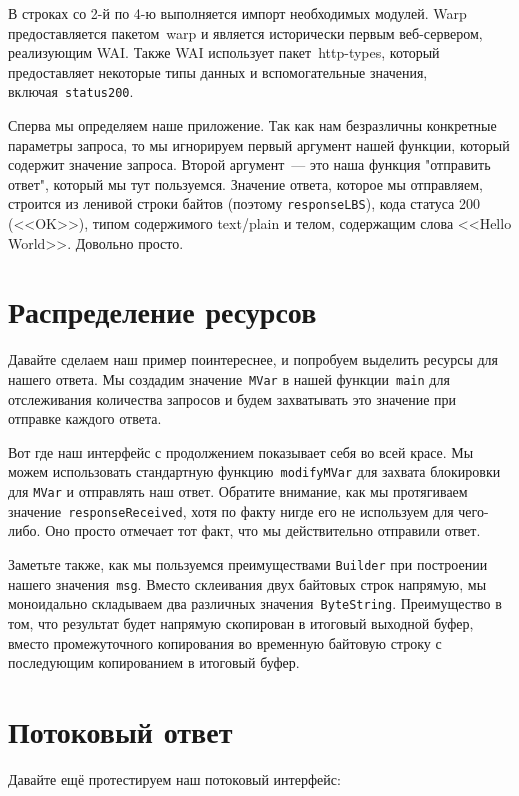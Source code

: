 В строках со 2-й по 4-ю выполняется импорт необходимых модулей. Warp
предоставляется пакетом~warp и является исторически первым веб-сервером,
реализующим WAI. Также WAI использует пакет~http-types, который предоставляет
некоторые типы данных и вспомогательные значения,
включая~\lstinline!status200!.

Сперва мы определяем наше приложение. Так как нам безразличны конкретные
параметры запроса, то мы игнорируем первый аргумент нашей функции, который
содержит значение запроса. Второй аргумент~--- это наша функция "отправить
ответ", который мы тут пользуемся. Значение ответа, которое мы отправляем,
строится из ленивой строки байтов (поэтому \lstinline'responseLBS'), кода
статуса 200 (<<OK>>), типом содержимого text/plain и телом, содержащим слова
<<Hello World>>. Довольно просто.

\section{Распределение ресурсов}
Давайте сделаем наш пример поинтереснее, и попробуем выделить ресурсы для
нашего ответа. Мы создадим значение~\lstinline'MVar' в нашей
функции~\lstinline'main' для отслеживания количества запросов и будем
захватывать это значение при отправке каждого ответа.


Вот где наш интерфейс с продолжением показывает себя во всей красе. Мы можем
использовать стандартную функцию~\lstinline'modifyMVar' для захвата блокировки
для \lstinline'MVar' и отправлять наш ответ. Обратите внимание, как мы
протягиваем значение~\lstinline'responseReceived', хотя по факту нигде его не
используем для чего-либо. Оно просто отмечает тот факт, что мы действительно
отправили ответ.

Заметьте также, как мы пользуемся преимуществами \lstinline'Builder' при
построении нашего значения~\lstinline'msg'. Вместо склеивания двух байтовых
строк напрямую, мы моноидально складываем два различных
значения~\lstinline'ByteString'. Преимущество в том, что результат будет
напрямую скопирован в итоговый выходной буфер, вместо промежуточного
копирования во временную байтовую строку с последующим копированием в итоговый
буфер.

\section{Потоковый ответ}
Давайте ещё протестируем наш потоковый интерфейс:

